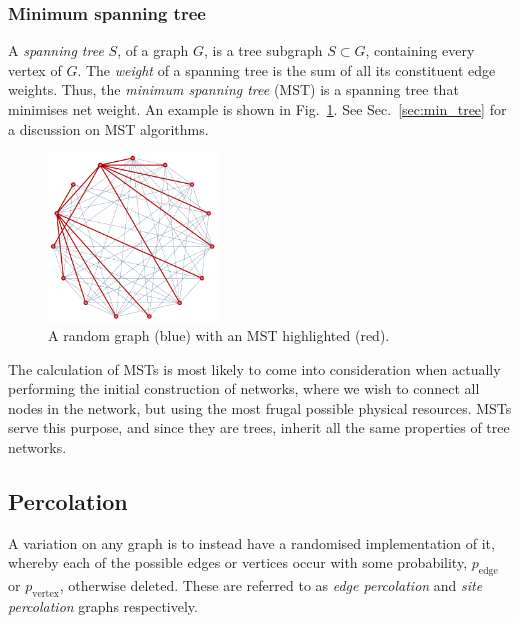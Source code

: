 %
%

\subsubsection{Minimum spanning tree} \label{sec:graph_MST} 

A \textit{spanning tree} $S$, of a graph $G$, is a tree subgraph \mbox{$S\subset G$}, containing every vertex of $G$. The \textit{weight} of a spanning tree is the sum of all its constituent edge weights. Thus, the \textit{minimum spanning tree} (MST) is a spanning tree that minimises net weight. An example is shown in Fig.~\ref{fig:mst}. See Sec.~\ref{sec:min_tree} for a discussion on MST algorithms.

\begin{figure}[!htbp]
\includegraphics[width=0.4\textwidth]{MST}
\caption{A random graph (blue) with an MST highlighted (red).} \label{fig:mst}
\end{figure}

The calculation of MSTs is most likely to come into consideration when actually performing the initial construction of networks, where we wish to connect all nodes in the network, but using the most frugal possible physical resources. MSTs serve this purpose, and since they are trees, inherit all the same properties of tree networks.

%
%

\subsection{Percolation}\label{sec:perc_topol}

A variation on any graph is to instead have a randomised implementation of it, whereby each of the possible edges or vertices occur with some probability, $p_\mathrm{edge}$ or $p_\mathrm{vertex}$, otherwise deleted. These are referred to as \textit{edge percolation} and \textit{site percolation} graphs respectively.

